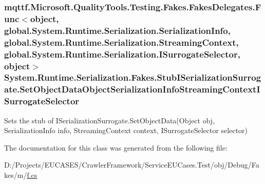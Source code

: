 \hypertarget{class_system_1_1_runtime_1_1_serialization_1_1_fakes_1_1_stub_i_serialization_surrogate_a5c2814104bf43f5e8b04a9c125d63ebf}{
\subsubsection[{Set\-Object\-Data\-Object\-Serialization\-Info\-Streaming\-Context\-I\-Surrogate\-Selector}]{\setlength{\rightskip}{0pt plus 5cm}mqttf.\-Microsoft.\-Quality\-Tools.\-Testing.\-Fakes.\-Fakes\-Delegates.\-Func$<$object, global.\-System.\-Runtime.\-Serialization.\-Serialization\-Info, global.\-System.\-Runtime.\-Serialization.\-Streaming\-Context, global.\-System.\-Runtime.\-Serialization.\-I\-Surrogate\-Selector, object$>$ System.\-Runtime.\-Serialization.\-Fakes.\-Stub\-I\-Serialization\-Surrogate.\-Set\-Object\-Data\-Object\-Serialization\-Info\-Streaming\-Context\-I\-Surrogate\-Selector}}\label{class_system_1_1_runtime_1_1_serialization_1_1_fakes_1_1_stub_i_serialization_surrogate_a5c2814104bf43f5e8b04a9c125d63ebf}


Sets the stub of I\-Serialization\-Surrogate.\-Set\-Object\-Data(\-Object obj, Serialization\-Info info, Streaming\-Context context, I\-Surrogate\-Selector selector)



The documentation for this class was generated from the following file\-:\begin{DoxyCompactItemize}
\item 
D\-:/\-Projects/\-E\-U\-C\-A\-S\-E\-S/\-Crawler\-Framework/\-Service\-E\-U\-Cases.\-Test/obj/\-Debug/\-Fakes/m/\hyperlink{m_2f_8cs}{f.\-cs}\end{DoxyCompactItemize}
